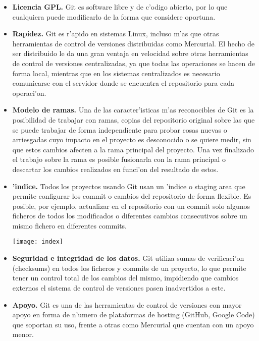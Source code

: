 \begin{itemize}
\item \textbf{Licencia GPL.} Git es software libre y de c'odigo abierto, por lo que cualquiera puede modificarlo de
la forma que considere oportuna.
\item \textbf{Rapidez.} Git es r'apido en sistemas Linux, incluso m'as que otras herramientas de control de versiones
distribuidas como Mercurial. El hecho de ser distribuido le da una gran ventaja en velocidad sobre otras herramientas
de control de versiones centralizadas, ya que todas las operaciones se hacen de forma local, mientras que en los
sistemas centralizados es necesario comunicarse con el servidor donde se encuentra el repositorio para cada
operaci'on.
\item \textbf{Modelo de ramas.} Una de las caracter'isticas m'as reconocibles de Git es la posibilidad de trabajar
con ramas, copias del repositorio original sobre las que se puede trabajar de forma independiente para probar cosas
nuevas o arriesgadas cuyo impacto en el proyecto es desconocido o se quiere medir, sin que estos cambios afecten a
la rama principal del proyecto. Una vez finalizado el trabajo sobre la rama es posible fusionarla con la rama
principal o descartar los cambios realizados en funci'on del resultado de estos.
\item \textbf{'indice.} Todos los proyectos usando Git usan un 'indice o staging area que permite configurar los
commit o cambios del repositorio de forma flexible. Es posible, por ejemplo, actualizar en el repositorio con un
commit solo algunos ficheros de todos los modificados o diferentes cambios consecutivos sobre un mismo fichero en
diferentes commits.

\begin{center}
\texttt{[image: index]}
\end{center}

\item \textbf{Seguridad e integridad de los datos.} Git utiliza sumas de verificaci'on (checksums) en todos los
ficheros y commits de un proyecto, lo que permite tener un control total de los cambios del mismo, impidiendo que
cambios externos el sistema de control de versiones pasen inadvertidos a este.
\item \textbf{Apoyo.} Git es una de las herramientas de control de versiones con mayor apoyo en forma de n'umero de
plataformas de hosting (GitHub, Google Code) que soportan su uso, frente a otras como Mercurial que cuentan con un
apoyo menor.
\end{itemize}

